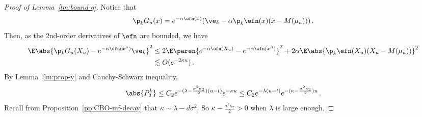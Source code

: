 \documentclass{amsart}
\begin{document}
\begin{proof}[Proof of Lemma~\ref{lm:bound-q}]
	Notice that 
	\begin{equation*}
		\p_k G_u(x) =  e^{-\alpha \efn(x)} ( \ve_k -\alpha \p_k \efn(x) (x - M(\mu_u))) \,.
	\end{equation*}
	Then, as the 2nd-order derivatives of $\efn$ are bounded, we have
	\begin{align*}
		\E \abs{\p_k G_u(X_u) - e^{-\alpha \efn(\tilde x^\mu)}\ve_k}^2 & \le 2 \E \paren{e^{-\alpha\efn(X_u)} - e^{-\alpha \efn(\tilde x^\mu)}}^2 + 2\alpha \E \abs{\p_k \efn(X_u) (X_u - M(\mu_u))}^2 \\ 
		& \lesssim O(e^{-2\kappa u}) \,.
	\end{align*}
	By Lemma~\ref{lm:prop-y} and Cauchy-Schwarz inequality, 
	\begin{equation*}
		\abs{P^k_2} \le C_2 e^{-(\lambda - \frac{\sigma^2 \kappa_2}{2}) (u-t)} e^{-\kappa u} \le C_2 e^{-\lambda (u-t)} e^{-(\kappa - \frac{\sigma^2 \kappa_2}{2}) u} \,.
	\end{equation*}
	Recall from Proposition~\ref{pp:CBO-mf-decay} that $\kappa \sim \lambda - d \sigma^2$.
	So $\kappa - \frac{\sigma^2 \kappa_2}{2} > 0$ when $\lambda$ is large enough.


\end{proof}
\end{document}
